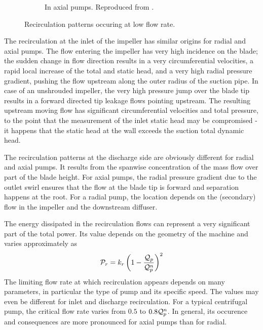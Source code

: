\begin{figure}[!h]
\begin{subfigure}{0.49\textwidth}
    \caption{In axial pumps. Reproduced
      from \cite{KSB}.}
    \label{fig:recirculationAxial}
  \end{subfigure}
  \caption{Recirculation patterns occuring at low flow rate.}
  \label{fig:recirculations}
\end{figure}

The recirculation at the inlet of the impeller has similar origins for
radial and axial pumps. The flow entering the impeller has very high
incidence on the blade; the sudden change in flow direction results in
a very circumferential velocities, a rapid local increase of the total
and static head, and a very high radial pressure gradient, pushing the
flow upstream along the outer radius of the suction pipe. In case of
an unshrouded impeller, the very high pressure jump over the blade tip
results in a forward directed tip leakage flows pointing upstream. The
resulting upstream moving flow has significant circumferential
velocities and total pressure, to the point that the measurement of
the inlet static head may be compromised - it happens that the static
head at the wall exceeds the suction total dynamic head.

The recirculation patterns at the discharge side are obviously
different for radial and axial pumps. It results from the spanwise
concentration of the mass flow over part of the blade height. For
axial pumps, the radial pressure gradient due to the outlet swirl
ensures that the flow at the blade tip is forward and separation
happens at the root. For a radial pump, the location depends on the
(secondary) flow in the impeller and the downstream diffuser.

The energy dissipated in the recirculation flows can represent a very
significant part of the total power. Its value depends on the geometry
of the machine and varies approximately as 
\begin{align*}
  \mathcal P_r = k_r \left(1 - \frac{\mathcal Q_p}{\mathcal Q_p^n}\right)^2
\end{align*}
The limiting flow rate at which recirculation appears depends on many
parameters, in particular the type of pump and its specific speed. The
values may even be different for inlet and discharge
recirculation. For a typical centrifugal pump, the critical flow rate
varies from $0.5$ to $0.8 \mathcal Q_p^n$. In general, its occurence and
consequences are more pronounced for axial pumps than for radial.



